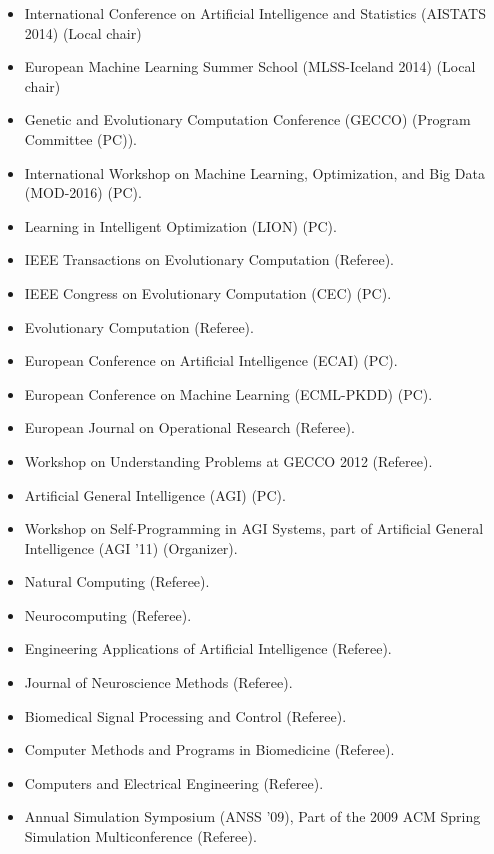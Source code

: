 \documentclass[a4paper,10pt]{cvclean}
\begin{document}
\begin{Professional Activities}
\begin{itemize}
\item International Conference on Artificial Intelligence and Statistics
  (AISTATS 2014) (Local chair)
\item European Machine Learning Summer School (MLSS-Iceland 2014) (Local chair)
\item Genetic and Evolutionary Computation Conference (GECCO) (Program Committee
  (PC)).
\item International Workshop on Machine Learning, Optimization, and Big Data (MOD-2016) (PC).
\item Learning in Intelligent Optimization (LION) (PC).
\item IEEE Transactions on Evolutionary Computation (Referee).
\item IEEE Congress on Evolutionary Computation (CEC) (PC).
\item Evolutionary Computation (Referee).
\item European Conference on Artificial Intelligence (ECAI) (PC).
\item European Conference on Machine Learning (ECML-PKDD) (PC).
\item European Journal on Operational Research (Referee).
\item Workshop on Understanding Problems at GECCO 2012 (Referee).
\item Artificial General Intelligence (AGI) (PC).
\item Workshop on Self-Programming in AGI Systems, part of Artificial
  General Intelligence (AGI '11) (Organizer).
\item Natural Computing (Referee).
\item Neurocomputing (Referee).
\item Engineering Applications of Artificial Intelligence (Referee).
\item Journal of Neuroscience Methods (Referee).
\item Biomedical Signal Processing and Control (Referee).
\item Computer Methods and Programs in Biomedicine (Referee).
\item Computers and Electrical Engineering (Referee).
\item Annual Simulation Symposium (ANSS '09), Part of the 2009 ACM Spring
  Simulation Multiconference (Referee).
\end{itemize}
\end{Professional Activities}
\end{document}
